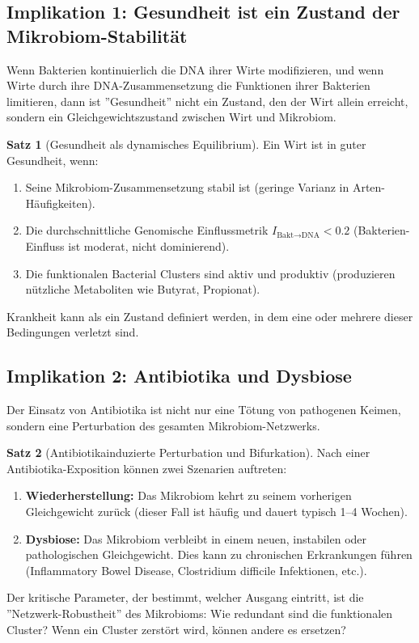 \documentclass[a4paper,12pt]{article}
\theoremstyle{definition}
\newtheorem{satz}{Satz}
\begin{document}

\subsection{Implikation 1: Gesundheit ist ein Zustand der Mikrobiom-Stabilität}

Wenn Bakterien kontinuierlich die DNA ihrer Wirte modifizieren, und wenn Wirte durch ihre DNA-Zusammensetzung die Funktionen ihrer Bakterien limitieren, dann ist ''Gesundheit'' nicht ein Zustand, den der Wirt allein erreicht, sondern ein Gleichgewichtszustand zwischen Wirt und Mikrobiom.

\begin{satz}[Gesundheit als dynamisches Equilibrium]
Ein Wirt ist in guter Gesundheit, wenn:
\begin{enumerate}
    \item Seine Mikrobiom-Zusammensetzung stabil ist (geringe Varianz in Arten-Häufigkeiten).
    \item Die durchschnittliche Genomische Einflussmetrik $I_{\text{Bakt} \to \text{DNA}} < 0.2$ (Bakterien-Einfluss ist moderat, nicht dominierend).
    \item Die funktionalen Bacterial Clusters sind aktiv und produktiv (produzieren nützliche Metaboliten wie Butyrat, Propionat).
\end{enumerate}

Krankheit kann als ein Zustand definiert werden, in dem eine oder mehrere dieser Bedingungen verletzt sind.
\end{satz}

\subsection{Implikation 2: Antibiotika und Dysbiose}

Der Einsatz von Antibiotika ist nicht nur eine Tötung von pathogenen Keimen, sondern eine Perturbation des gesamten Mikrobiom-Netzwerks.

\begin{satz}[Antibiotikainduzierte Perturbation und Bifurkation]
Nach einer Antibiotika-Exposition können zwei Szenarien auftreten:
\begin{enumerate}
    \item \textbf{Wiederherstellung:} Das Mikrobiom kehrt zu seinem vorherigen Gleichgewicht zurück (dieser Fall ist häufig und dauert typisch 1--4 Wochen).
    
    \item \textbf{Dysbiose:} Das Mikrobiom verbleibt in einem neuen, instabilen oder pathologischen Gleichgewicht. Dies kann zu chronischen Erkrankungen führen (Inflammatory Bowel Disease, Clostridium difficile Infektionen, etc.).
\end{enumerate}

Der kritische Parameter, der bestimmt, welcher Ausgang eintritt, ist die ''Netzwerk-Robustheit'' des Mikrobioms: Wie redundant sind die funktionalen Cluster? Wenn ein Cluster zerstört wird, können andere es ersetzen?
\end{satz}
\end{document}
